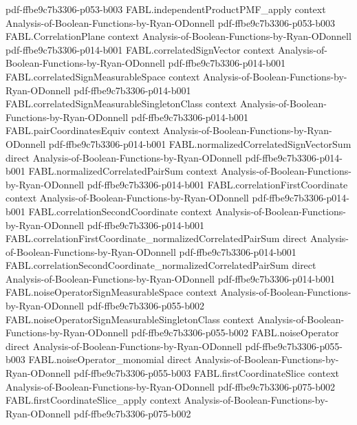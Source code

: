 \begin{theorem}
  {pdf-ffbe9c7b3306-p053-b003}
\proofstep
  {FABL.independentProductPMF_apply}
  {context}
  {Analysis-of-Boolean-Functions-by-Ryan-ODonnell}
  {pdf-ffbe9c7b3306-p053-b003}
\proofstep
  {FABL.CorrelationPlane}
  {context}
  {Analysis-of-Boolean-Functions-by-Ryan-ODonnell}
  {pdf-ffbe9c7b3306-p014-b001}
\proofstep
  {FABL.correlatedSignVector}
  {context}
  {Analysis-of-Boolean-Functions-by-Ryan-ODonnell}
  {pdf-ffbe9c7b3306-p014-b001}
\proofstep
  {FABL.correlatedSignMeasurableSpace}
  {context}
  {Analysis-of-Boolean-Functions-by-Ryan-ODonnell}
  {pdf-ffbe9c7b3306-p014-b001}
\proofstep
  {FABL.correlatedSignMeasurableSingletonClass}
  {context}
  {Analysis-of-Boolean-Functions-by-Ryan-ODonnell}
  {pdf-ffbe9c7b3306-p014-b001}
\proofstep
  {FABL.pairCoordinatesEquiv}
  {context}
  {Analysis-of-Boolean-Functions-by-Ryan-ODonnell}
  {pdf-ffbe9c7b3306-p014-b001}
\proofstep
  {FABL.normalizedCorrelatedSignVectorSum}
  {direct}
  {Analysis-of-Boolean-Functions-by-Ryan-ODonnell}
  {pdf-ffbe9c7b3306-p014-b001}
\proofstep
  {FABL.normalizedCorrelatedPairSum}
  {context}
  {Analysis-of-Boolean-Functions-by-Ryan-ODonnell}
  {pdf-ffbe9c7b3306-p014-b001}
\proofstep
  {FABL.correlationFirstCoordinate}
  {context}
  {Analysis-of-Boolean-Functions-by-Ryan-ODonnell}
  {pdf-ffbe9c7b3306-p014-b001}
\proofstep
  {FABL.correlationSecondCoordinate}
  {context}
  {Analysis-of-Boolean-Functions-by-Ryan-ODonnell}
  {pdf-ffbe9c7b3306-p014-b001}
\proofstep
  {FABL.correlationFirstCoordinate_normalizedCorrelatedPairSum}
  {direct}
  {Analysis-of-Boolean-Functions-by-Ryan-ODonnell}
  {pdf-ffbe9c7b3306-p014-b001}
\proofstep
  {FABL.correlationSecondCoordinate_normalizedCorrelatedPairSum}
  {direct}
  {Analysis-of-Boolean-Functions-by-Ryan-ODonnell}
  {pdf-ffbe9c7b3306-p014-b001}
\proofstep
  {FABL.noiseOperatorSignMeasurableSpace}
  {context}
  {Analysis-of-Boolean-Functions-by-Ryan-ODonnell}
  {pdf-ffbe9c7b3306-p055-b002}
\proofstep
  {FABL.noiseOperatorSignMeasurableSingletonClass}
  {context}
  {Analysis-of-Boolean-Functions-by-Ryan-ODonnell}
  {pdf-ffbe9c7b3306-p055-b002}
\proofstep
  {FABL.noiseOperator}
  {direct}
  {Analysis-of-Boolean-Functions-by-Ryan-ODonnell}
  {pdf-ffbe9c7b3306-p055-b003}
\proofstep
  {FABL.noiseOperator_monomial}
  {direct}
  {Analysis-of-Boolean-Functions-by-Ryan-ODonnell}
  {pdf-ffbe9c7b3306-p055-b003}
\proofstep
  {FABL.firstCoordinateSlice}
  {context}
  {Analysis-of-Boolean-Functions-by-Ryan-ODonnell}
  {pdf-ffbe9c7b3306-p075-b002}
\proofstep
  {FABL.firstCoordinateSlice_apply}
  {context}
  {Analysis-of-Boolean-Functions-by-Ryan-ODonnell}
  {pdf-ffbe9c7b3306-p075-b002}

\end{theorem}
